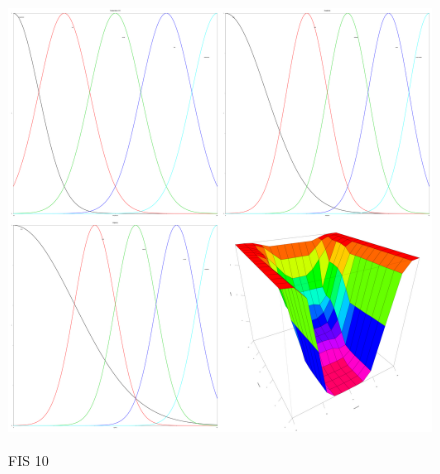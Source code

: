 \documentclass[12pt, a4paper]{report}
\begin{document}
\begin{figure}[ht]
  \centering
  \caption{FIS 10}
  \includegraphics[width=0.4\textheight]{membershipFns10.png}
  \label{fig:membershipfns10}
\end{figure}
\end{document}
